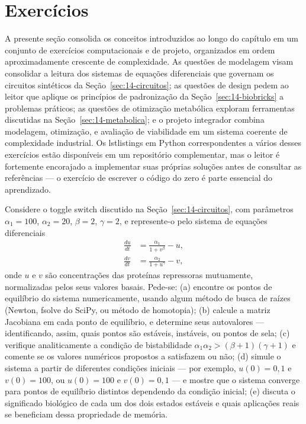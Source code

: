 \section{Exercícios}
\label{sec:14-exercicios}

A presente seção consolida os conceitos introduzidos ao longo do capítulo em um conjunto de exercícios computacionais e de projeto, organizados em ordem aproximadamente crescente de complexidade. As questões de modelagem visam consolidar a leitura dos sistemas de equações diferenciais que governam os circuitos sintéticos da Seção~\ref{sec:14-circuitos}; as questões de design pedem ao leitor que aplique os princípios de padronização da Seção~\ref{sec:14-biobricks} a problemas práticos; as questões de otimização metabólica exploram ferramentas discutidas na Seção~\ref{sec:14-metabolica}; e o projeto integrador combina modelagem, otimização, e avaliação de viabilidade em um sistema coerente de complexidade industrial. Os lstlistings em Python correspondentes a vários desses exercícios estão disponíveis em um repositório complementar, mas o leitor é fortemente encorajado a implementar suas próprias soluções antes de consultar as referências --- o exercício de escrever o código do zero é parte essencial do aprendizado.

\begin{exercicio}
Considere o toggle switch discutido na Seção~\ref{sec:14-circuitos}, com parâmetros $\alpha_1 = 100$, $\alpha_2 = 20$, $\beta = 2$, $\gamma = 2$, e represente-o pelo sistema de equações diferenciais
\begin{align*}
\frac{du}{dt} &= \frac{\alpha_1}{1 + v^\beta} - u, \\
\frac{dv}{dt} &= \frac{\alpha_2}{1 + u^\gamma} - v,
\end{align*}
onde $u$ e $v$ são concentrações das proteínas repressoras mutuamente, normalizadas pelos seus valores basais. Pede-se: (a) encontre os pontos de equilíbrio do sistema numericamente, usando algum método de busca de raízes (Newton, fsolve do SciPy, ou método de homotopia); (b) calcule a matriz Jacobiana em cada ponto de equilíbrio, e determine seus autovalores --- identificando, assim, quais pontos são estáveis, instáveis, ou pontos de sela; (c) verifique analiticamente a condição de bistabilidade $\alpha_1\alpha_2 > (\beta + 1)(\gamma + 1)$ e comente se os valores numéricos propostos a satisfazem ou não; (d) simule o sistema a partir de diferentes condições iniciais --- por exemplo, $u(0) = 0{,}1$ e $v(0) = 100$, ou $u(0) = 100$ e $v(0) = 0{,}1$ --- e mostre que o sistema converge para pontos de equilíbrio distintos dependendo da condição inicial; (e) discuta o significado biológico de cada um dos dois estados estáveis e quais aplicações reais se beneficiam dessa propriedade de memória.
\end{exercicio}

